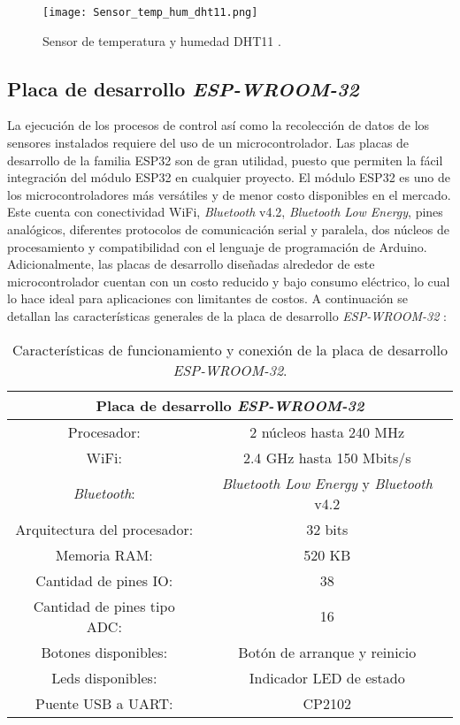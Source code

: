 \begin{figure}[H]
	\centering
	\texttt{[image: Sensor\_temp\_hum\_dht11.png]}
	\caption{Sensor de temperatura y humedad DHT11 \cite{tettsa_dht11}.}
	\label{fig:mesh11}
\end{figure}

\subsection*{Placa de desarrollo \textit{ESP-WROOM-32}}
La ejecución de los procesos de control así como la recolección de datos de los sensores instalados requiere del uso de un microcontrolador. Las placas de desarrollo de la familia ESP32 son de gran utilidad, puesto que permiten la fácil integración del módulo ESP32 en cualquier proyecto. El módulo ESP32 es uno de los microcontroladores más versátiles y de menor costo disponibles en el mercado. Este cuenta con conectividad WiFi, \textit{Bluetooth} v4.2, \textit{Bluetooth Low Energy}, pines analógicos, diferentes protocolos de comunicación serial y paralela, dos núcleos de procesamiento y compatibilidad con el lenguaje de programación de Arduino. Adicionalmente, las placas de desarrollo diseñadas alrededor de este microcontrolador cuentan con un costo reducido y bajo consumo eléctrico, lo cual lo hace ideal para aplicaciones con limitantes de costos. A continuación se detallan las características generales de la placa de desarrollo \textit{ESP-WROOM-32} \cite{electronic_wings_espwroom32}:

\begin{table}[H]
	\centering
	\begin{tabular}{|c|c|}
		\hline
		\multicolumn{2}{|c|}{\textbf{Placa de desarrollo \textit{ESP-WROOM-32}}}\\ \hline
		Procesador: & 2 núcleos hasta 240 MHz \\ \hline
		WiFi: & 2.4 GHz hasta 150 Mbits/s \\ \hline
		\textit{Bluetooth}: & \textit{Bluetooth Low Energy} y \textit{Bluetooth} v4.2 \\ \hline
		Arquitectura del procesador: & 32 bits \\ \hline
		Memoria RAM: & 520 KB \\ \hline
		Cantidad de pines IO: & 38 \\ \hline
		Cantidad de pines tipo ADC: & 16 \\ \hline
		Botones disponibles: & Botón de arranque y reinicio \\ \hline
		Leds disponibles: & Indicador LED de estado \\ \hline
		Puente USB a UART: & CP2102 \\ \hline
	\end{tabular}
	\caption{Características de funcionamiento y conexión de la placa de desarrollo \textit{ESP-WROOM-32}.}
	\label{Cuadro6}
\end{table}

